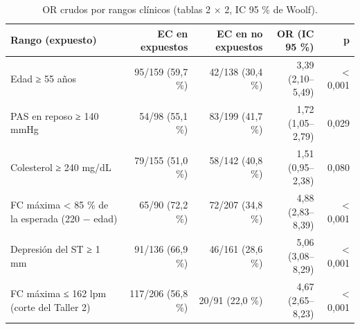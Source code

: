 \begin{table}[H]
\caption{OR crudos por rangos clínicos (tablas 2 × 2, IC 95 \% de Woolf).}
\label{tab:rangos}
\begin{tabular}{lrrrr}
\toprule
Rango (expuesto) & EC en expuestos & EC en no expuestos & OR (IC 95 \%) & p \\
\midrule
Edad ≥ 55 años & 95/159 (59,7 \%) & 42/138 (30,4 \%) & 3,39 (2,10–5,49) & < 0,001 \\
PAS en reposo ≥ 140 mmHg & 54/98 (55,1 \%) & 83/199 (41,7 \%) & 1,72 (1,05–2,79) & 0,029 \\
Colesterol ≥ 240 mg/dL & 79/155 (51,0 \%) & 58/142 (40,8 \%) & 1,51 (0,95–2,38) & 0,080 \\
FC máxima < 85 \% de la esperada (220 − edad) & 65/90 (72,2 \%) & 72/207 (34,8 \%) & 4,88 (2,83–8,39) & < 0,001 \\
Depresión del ST ≥ 1 mm & 91/136 (66,9 \%) & 46/161 (28,6 \%) & 5,06 (3,08–8,29) & < 0,001 \\
FC máxima ≤ 162 lpm (corte del Taller 2) & 117/206 (56,8 \%) & 20/91 (22,0 \%) & 4,67 (2,65–8,23) & < 0,001 \\
\bottomrule
\end{tabular}
\end{table}
